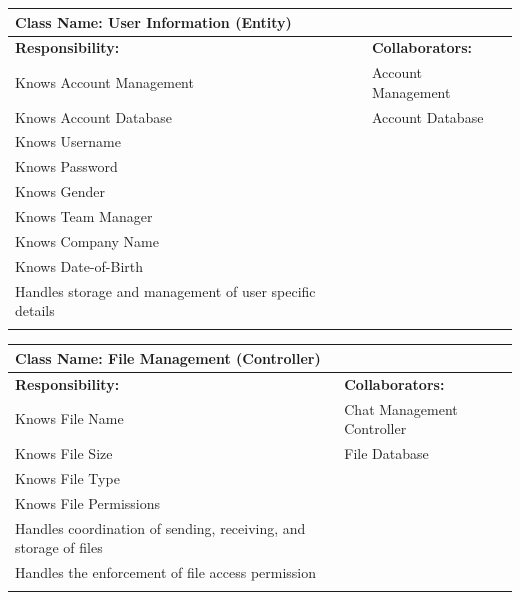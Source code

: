 \documentclass[]{article}
\begin{document}
\begin{itemize}
	\begin{table}[ht]
		\centering
		\begin{tabular}{|p{7cm}|p{7cm}|}
		\hline 
		 \multicolumn{2}{|l|}{\textbf{Class Name:} User Information (Entity)} \\
		\hline
		\textbf{Responsibility:} & \textbf{Collaborators:} \\
		\hline

			Knows Account Management & Account Management \\
			Knows Account Database & Account Database \\
			Knows Username &\\
			Knows Password &\\
			Knows Gender &\\
			Knows Team Manager &\\
			Knows Company Name &\\
			Knows Date-of-Birth &\\
			Handles storage and management of user specific details &\\
		\vspace{0.1in} & \\
		\hline
		\end{tabular}
	\end{table}

	\begin{table}[ht]
		\centering
		\begin{tabular}{|p{7cm}|p{7cm}|}
		\hline 
		 \multicolumn{2}{|l|}{\textbf{Class Name:} File Management (Controller)} \\
		\hline
		\textbf{Responsibility:} & \textbf{Collaborators:} \\
		\hline
			Knows File Name & Chat Management Controller\\
			Knows File Size & File Database\\
			Knows File Type &\\
			Knows File Permissions &\\
			Handles coordination of sending, receiving, and storage of files &\\
			Handles the enforcement of file access permission &\\
		\vspace{0.1in} & \\
		\hline
		\end{tabular}
	\end{table}



\end{itemize}
\end{document}
